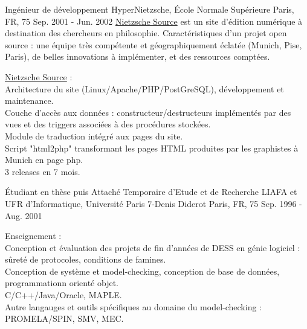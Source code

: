 \begin{cventries}
  \cventry
    {Ingénieur de développement} %
    {HyperNietzsche, \'Ecole Normale Supérieure} %
    {Paris, FR, 75} %
    {Sep. 2001 - Jun. 2002} %
{
\href{http://www.nietzschesource.org}{Nietzsche Source} est un site d'édition numérique à destination des chercheurs en philosophie. Caractéristiques d'un projet open source : une équipe très compétente et géographiquement éclatée (Munich, Pise, Paris), de belles innovations à implémenter, et des ressources comptées.} %
{
      \begin{cvitems} %
        \item {\href{http://www.nietzschesource.org}{Nietzsche Source} :\\Architecture du site (Linux/Apache/PHP/PostGreSQL), développement et maintenance.\\Couche d'accès aux données : constructeur/destructeurs implémentés par des vues et des triggers associées à des procédures stockées.\\Module de traduction intégré aux pages du site.\\Script "html2php" transformant les pages HTML produites par les graphistes à Munich en page php.\\3 releases en 7 mois.}
      \end{cvitems}
} %

  \cventry
    {\'Etudiant en thèse puis Attaché Temporaire d'Etude et de Recherche} %
    {LIAFA et UFR d'Informatique, Université Paris 7-Denis Diderot} %
    {Paris, FR, 75} %
    {Sep. 1996 - Aug. 2001} %
    {} %
{
      \begin{cvitems} %
        \item {Enseignement :\\
Conception et évaluation des projets de fin d'années de DESS en génie logiciel : sûreté de protocoles, conditions de famines.\\ Conception de système et model-checking, conception de base de données, programmationn orienté objet.\\C/C++/Java/Oracle, MAPLE.\\Autre langauges et outils spécifiques au domaine du model-checking : PROMELA/SPIN, SMV, MEC.}
      \end{cvitems}
} %


\end{cventries}
